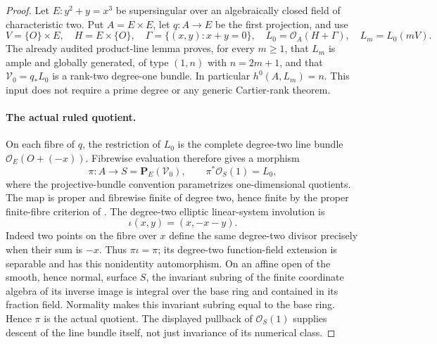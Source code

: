 \begin{proof}
Let \(E:y^2+y=x^3\) be supersingular over an algebraically closed
field of characteristic two. Put \(A=E\times E\), let \(q:A\to E\)
be the first projection, and use
\[
 V=\{O\}\times E,\quad H=E\times\{O\},\quad
 \Gamma=\{(x,y):x+y=0\},\quad
 L_0=\mathcal O_A(H+\Gamma),\quad L_m=L_0(mV).
\]
The already audited product-line lemma proves, for every \(m\ge1\),
that \(L_m\) is ample and globally generated, of type \((1,n)\)
with \(n=2m+1\), and that
\(\mathcal V_0=q_*L_0\) is a rank-two degree-one bundle.
In particular \(h^0(A,L_m)=n\). This input does not require a
prime degree or any generic Cartier-rank theorem.

\paragraph{The actual ruled quotient.}
On each fibre of \(q\), the restriction of \(L_0\) is the complete
degree-two line bundle \(\mathcal O_E(O+(-x))\). Fibrewise evaluation
therefore gives a morphism
\[
 \pi:A\longrightarrow S=\mathbf P_E(\mathcal V_0),\qquad
 \pi^*\mathcal O_S(1)=L_0,
\]
where the projective-bundle convention parametrizes one-dimensional
quotients. The map is proper and fibrewise finite of degree two, hence
finite by the proper finite-fibre criterion of
\cite[Lemma~37.44.1, Tag~02LS]{StacksProperFiniteCP38}.
The degree-two elliptic linear-system involution is
\[
                 \iota(x,y)=(x,-x-y).
\]
Indeed two points on the fibre over \(x\) define the same
degree-two divisor precisely when their sum is \(-x\). Thus
\(\pi\iota=\pi\); its degree-two function-field extension is
separable and has this nonidentity automorphism. On an affine
open of the smooth, hence normal, surface \(S\), the invariant
subring of the finite coordinate algebra of its inverse image
is integral over the base ring and contained in its fraction
field. Normality makes this invariant subring equal to the base
ring. Hence \(\pi\) is the actual quotient. The displayed
pullback of \(\mathcal O_S(1)\) supplies descent of the line
bundle itself, not just invariance of its numerical class.


\end{proof}
